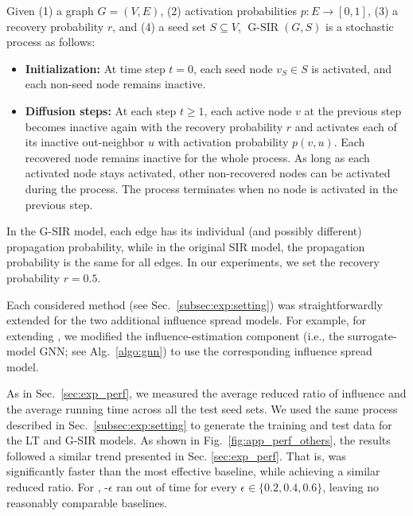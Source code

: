 \begin{definition}\label{def:GSIR}
    Given 
    (1) a graph $G = (V, E)$,
    (2) activation probabilities $p: E \rightarrow [0,1]$,
    (3) a recovery probability $r$,
    and
    (4) a seed set $S \subseteq V$,
    $\operatorname{G-SIR}(G, S)$ is a stochastic process as follows:
    \begin{itemize}[leftmargin=*,topsep=0pt]
        \item \textbf{Initialization:}         
        At time step $t = 0$, each seed node $v_S \in S$ is activated, and each non-seed node remains inactive.
        \item \textbf{Diffusion steps:}
        At each step $t \geq 1$,
        each active node $v$ at the previous step becomes inactive again with the recovery probability $r$ and activates each of its inactive out-neighbor $u$ with activation probability $p(v, u)$. 
        Each recovered node remains inactive for the whole process.
        As long as each activated node stays activated, other non-recovered nodes can be activated during the process. The process terminates when no node is activated in the previous step.
    \end{itemize}
\end{definition}

In the G-SIR model, each edge has its individual (and possibly different) propagation probability, while in the original SIR model, the propagation probability is the same for all edges. 
In our experiments, we set the recovery probability $r = 0.5$.

Each considered method (see Sec.~\ref{subsec:exp:setting}) was straightforwardly extended for the two additional influence spread models.
For example, for extending \method, we modified the influence-estimation component (i.e., the surrogate-model GNN; see Alg.~\ref{algo:gnn}) to use the corresponding influence spread model.

As in Sec.~\ref{sec:exp_perf}, we measured the average reduced ratio of influence and the average running time across all the test seed sets. 
We used the same process described in Sec.~\ref{subsec:exp:setting} to generate the training and test data for the LT and G-SIR models. 
As shown in Fig.~\ref{fig:app_perf_others}, the results followed a similar trend presented in Sec. \ref{sec:exp_perf}. 
That is, \advp was significantly faster than the most effective baseline, while achieving a similar reduced ratio.
For \WL, \RIS-$\epsilon$ ran out of time for every $\epsilon \in \{0.2, 0.4, 0.6\}$, leaving no reasonably comparable baselines.

